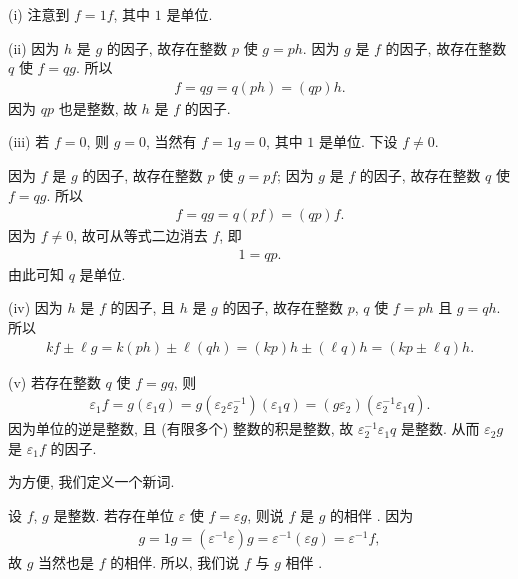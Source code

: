 \begin{pf}
    (i) 注意到 $f = 1f$, 其中 $1$ 是单位.

    (ii) 因为 $h$ 是 $g$ 的因子, 故存在整数 $p$ 使 $g = ph$. 因为 $g$ 是 $f$ 的因子, 故存在整数 $q$ 使 $f = qg$. 所以
    \begin{align*}
        f = qg = q(ph) = (qp)h.
    \end{align*}
    因为 $qp$ 也是整数, 故 $h$ 是 $f$ 的因子.

    (iii) 若 $f = 0$, 则 $g = 0$, 当然有 $f = 1 g = 0$, 其中 $1$ 是单位. 下设 $f \neq 0$.

    因为 $f$ 是 $g$ 的因子, 故存在整数 $p$ 使 $g = pf$; 因为 $g$ 是 $f$ 的因子, 故存在整数 $q$ 使 $f = qg$. 所以
    \begin{align*}
        f = qg = q(pf) = (qp)f.
    \end{align*}
    因为 $f \neq 0$, 故可从等式二边消去 $f$, 即
    \begin{align*}
        1 = qp.
    \end{align*}
    由此可知 $q$ 是单位.

    (iv) 因为 $h$ 是 $f$ 的因子, 且 $h$ 是 $g$ 的因子, 故存在整数 $p$, $q$ 使 $f = ph$ 且 $g = qh$. 所以
    \begin{align*}
        kf \pm \ell g = k(ph) \pm \ell (qh) = (kp) h \pm (\ell q) h = (kp \pm \ell q) h.
    \end{align*}

    (v) 若存在整数 $q$ 使 $f = gq$, 则
    \begin{align*}
        \varepsilon_1 f = g(\varepsilon_1 q) = g(\varepsilon_2 \varepsilon_2^{-1}) (\varepsilon_1 q) = (g\varepsilon_2) (\varepsilon_2^{-1} \varepsilon_1 q).
    \end{align*}
    因为单位的逆是整数, 且 (有限多个) 整数的积是整数, 故 $\varepsilon_2^{-1} \varepsilon_1 q$ 是整数. 从而 $\varepsilon_2 g$ 是 $\varepsilon_1 f$ 的因子.
\end{pf}

为方便, 我们定义一个新词.

\begin{definition}
    设 $f$, $g$ 是整数. 若存在单位 $\varepsilon$ 使 $f = \varepsilon g$, 则说 $f$ 是 $g$ 的相伴 . 因为
    \begin{align*}
        g = 1g = (\varepsilon^{-1} \varepsilon) g = \varepsilon^{-1} (\varepsilon g) = \varepsilon^{-1} f,
    \end{align*}
    故 $g$ 当然也是 $f$ 的相伴. 所以, 我们说 $f$ 与 $g$ 相伴 .
\end{definition}

